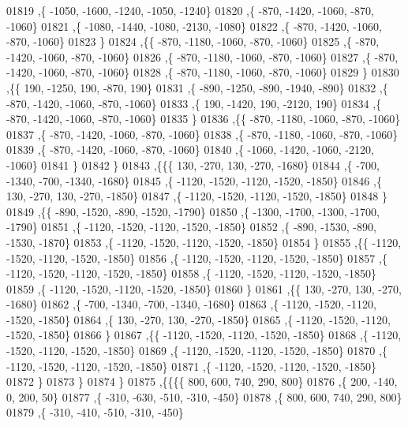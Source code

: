 \begin{DoxyCode}
01819     ,\{ -1050, -1600, -1240, -1050, -1240\}
01820     ,\{  -870, -1420, -1060,  -870, -1060\}
01821     ,\{ -1080, -1440, -1080, -2130, -1080\}
01822     ,\{  -870, -1420, -1060,  -870, -1060\}
01823     \}
01824    ,\{\{  -870, -1180, -1060,  -870, -1060\}
01825     ,\{  -870, -1420, -1060,  -870, -1060\}
01826     ,\{  -870, -1180, -1060,  -870, -1060\}
01827     ,\{  -870, -1420, -1060,  -870, -1060\}
01828     ,\{  -870, -1180, -1060,  -870, -1060\}
01829     \}
01830    ,\{\{   190, -1250,   190,  -870,   190\}
01831     ,\{  -890, -1250,  -890, -1940,  -890\}
01832     ,\{  -870, -1420, -1060,  -870, -1060\}
01833     ,\{   190, -1420,   190, -2120,   190\}
01834     ,\{  -870, -1420, -1060,  -870, -1060\}
01835     \}
01836    ,\{\{  -870, -1180, -1060,  -870, -1060\}
01837     ,\{  -870, -1420, -1060,  -870, -1060\}
01838     ,\{  -870, -1180, -1060,  -870, -1060\}
01839     ,\{  -870, -1420, -1060,  -870, -1060\}
01840     ,\{ -1060, -1420, -1060, -2120, -1060\}
01841     \}
01842    \}
01843   ,\{\{\{   130,  -270,   130,  -270, -1680\}
01844     ,\{  -700, -1340,  -700, -1340, -1680\}
01845     ,\{ -1120, -1520, -1120, -1520, -1850\}
01846     ,\{   130,  -270,   130,  -270, -1850\}
01847     ,\{ -1120, -1520, -1120, -1520, -1850\}
01848     \}
01849    ,\{\{  -890, -1520,  -890, -1520, -1790\}
01850     ,\{ -1300, -1700, -1300, -1700, -1790\}
01851     ,\{ -1120, -1520, -1120, -1520, -1850\}
01852     ,\{  -890, -1530,  -890, -1530, -1870\}
01853     ,\{ -1120, -1520, -1120, -1520, -1850\}
01854     \}
01855    ,\{\{ -1120, -1520, -1120, -1520, -1850\}
01856     ,\{ -1120, -1520, -1120, -1520, -1850\}
01857     ,\{ -1120, -1520, -1120, -1520, -1850\}
01858     ,\{ -1120, -1520, -1120, -1520, -1850\}
01859     ,\{ -1120, -1520, -1120, -1520, -1850\}
01860     \}
01861    ,\{\{   130,  -270,   130,  -270, -1680\}
01862     ,\{  -700, -1340,  -700, -1340, -1680\}
01863     ,\{ -1120, -1520, -1120, -1520, -1850\}
01864     ,\{   130,  -270,   130,  -270, -1850\}
01865     ,\{ -1120, -1520, -1120, -1520, -1850\}
01866     \}
01867    ,\{\{ -1120, -1520, -1120, -1520, -1850\}
01868     ,\{ -1120, -1520, -1120, -1520, -1850\}
01869     ,\{ -1120, -1520, -1120, -1520, -1850\}
01870     ,\{ -1120, -1520, -1120, -1520, -1850\}
01871     ,\{ -1120, -1520, -1120, -1520, -1850\}
01872     \}
01873    \}
01874   \}
01875  ,\{\{\{\{   800,   600,   740,   290,   800\}
01876     ,\{   200,  -140,     0,   200,    50\}
01877     ,\{  -310,  -630,  -510,  -310,  -450\}
01878     ,\{   800,   600,   740,   290,   800\}
01879     ,\{  -310,  -410,  -510,  -310,  -450\}

\end{DoxyCode}
